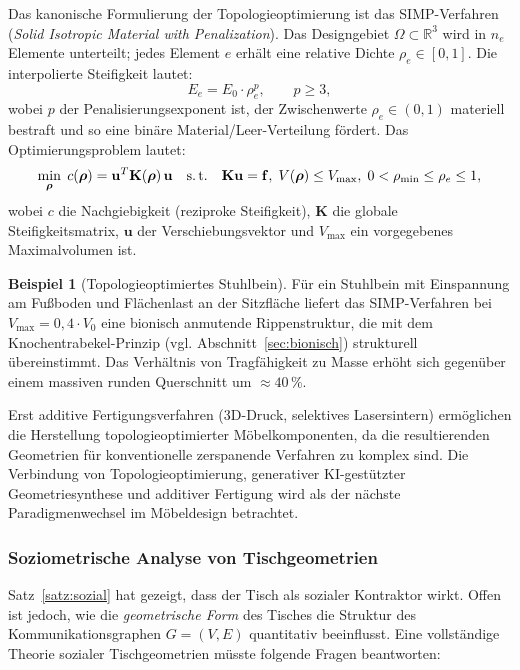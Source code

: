﻿\documentclass[a4paper,12pt]{article}
\theoremstyle{definition}
\newtheorem{beispiel}{Beispiel}
\begin{document}
Das kanonische Formulierung der Topologieoptimierung ist das SIMP-Verfahren~\cite{BendsoeSignmund2003}
(\emph{Solid Isotropic Material with Penalization}). Das Designgebiet
$\Omega \subset \mathbb{R}^3$ wird in $n_e$ Elemente unterteilt; jedes Element $e$
erh\"{a}lt eine relative Dichte $\rho_e \in [0, 1]$.
Die interpolierte Steifigkeit lautet:
\[
	E_e = E_0 \cdot \rho_e^p, \qquad p \geq 3,
\]
wobei $p$ der Penalisierungsexponent ist, der Zwischenwerte $\rho_e \in (0,1)$
materiell bestraft und so eine bin\"{a}re Material/Leer-Verteilung f\"{o}rdert.
Das Optimierungsproblem lautet:
\[
	\min_{\boldsymbol{\rho}} \; c(\boldsymbol{\rho}) = \mathbf{u}^T \mathbf{K}(\boldsymbol{\rho})\,\mathbf{u}
	\quad \text{s.\,t.} \quad
	\mathbf{K}\mathbf{u} = \mathbf{f},\;
	V(\boldsymbol{\rho}) \leq V_{\max},\;
	0 < \rho_{\min} \leq \rho_e \leq 1,
\]
wobei $c$ die Nachgiebigkeit (reziproke Steifigkeit), $\mathbf{K}$ die globale
Steifigkeitsmatrix, $\mathbf{u}$ der Verschiebungsvektor und $V_{\max}$ ein
vorgegebenes Maximalvolumen ist.

\begin{beispiel}[Topologieoptimiertes Stuhlbein]
	F\"{u}r ein Stuhlbein mit Einspannung am Fu\ss{}boden und Fl\"{a}chenlast an der
	Sitzfl\"{a}che liefert das SIMP-Verfahren bei $V_{\max} = 0{,}4 \cdot V_0$ eine
	bionisch anmutende Rippenstruktur, die mit dem Knochentrabekel-Prinzip
	(vgl. Abschnitt~\ref{sec:bionisch}) strukturell \"{u}bereinstimmt. Das Verh\"{a}ltnis
	von Tragf\"{a}higkeit zu Masse erh\"{o}ht sich gegen\"{u}ber einem massiven runden
	Querschnitt um $\approx 40\,\%$.
\end{beispiel}

Erst additive Fertigungsverfahren (3D-Druck, selektives Lasersintern) erm\"{o}glichen
die Herstellung topologieoptimierter M\"{o}belkomponenten, da die resultierenden
Geometrien f\"{u}r konventionelle zerspanende Verfahren zu komplex sind.
Die Verbindung von Topologieoptimierung, generativer KI-gest\"{u}tzter
Geometriesynthese und additiver Fertigung wird als der n\"{a}chste Paradigmenwechsel
im M\"{o}beldesign betrachtet.

\subsubsection{Soziometrische Analyse von Tischgeometrien}
\label{sec:soziometrisch}

Satz~\ref{satz:sozial} hat gezeigt, dass der Tisch als sozialer Kontraktor wirkt.
Offen ist jedoch, wie die \emph{geometrische Form} des Tisches die Struktur des
Kommunikationsgraphen $G = (V, E)$ quantitativ beeinflusst. Eine vollst\"{a}ndige
Theorie sozialer Tischgeometrien m\"{u}sste folgende Fragen beantworten:
\end{document}
